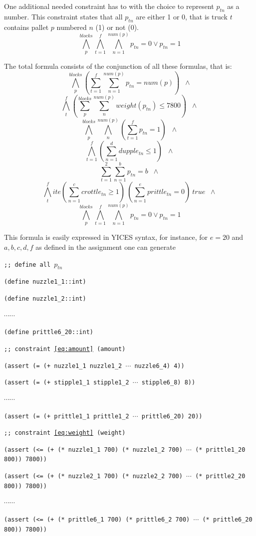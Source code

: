 \documentclass[12pt]{article}
\begin{document}
One additional needed constraint has to with the choice to represent $p_{tn}$
as a number. This constraint states that all $p_{tn}$ are either 1 or 0, that is
truck $t$ contains pallet $p$ numbered $n$ (1) or not (0).
\begin{equation} \label{eq:range}
  \bigwedge_p^{blocks} \bigwedge_{t=1}^f \bigwedge_{n=1}^{num(p)} 
	p_{tn} = 0 \vee p_{tn} = 1
\end{equation}

The total formula consists of the conjunction of all these formulas, that is:
\[ \bigwedge_p^{blocks} (\sum_{t=1}^{f} \sum_{n=1}^{num(p)} p_{tn} = num(p))
	\;\; \wedge \]
\[ \bigwedge_t^f (\sum_p^{blocks} \sum_n^{num(p)} weight(p_{tn}) \leq 7800)
	\;\; \wedge \]
\[ \bigwedge_p^{blocks} \bigwedge_n^{num(p)} (\sum_{t=1}^f p_{tn} = 1) 
	\;\; \wedge \]
\[ \bigwedge_{t=1}^f (\sum_{n=1}^d dupple_{tn} \leq 1) \;\; \wedge \]
\[ \sum_{t=1}^2 \sum_{n=1}^b p_{tn} = b \;\; \wedge \]
\[ \bigwedge_t^f ite 	(\sum_{n=1}^c crottle_{tn} \geq 1)\  
						(\sum_{n=1}^e prittle_{tn} = 0)\ 
						true 
	\;\; \wedge \]
\[ \bigwedge_p^{blocks} \bigwedge_{t=1}^f \bigwedge_{n=1}^{num(p)} 
	p_{tn} = 0 \vee p_{tn} = 1 \]

This formula is easily expressed in YICES syntax, for instance, for
$e=20$ and $a,b,c,d,f$ as defined in the assignment one can generate

{\footnotesize

{\tt ;; define all $p_{tn}$ }

{\tt (define nuzzle1\_1::int) }

{\tt (define nuzzle1\_2::int) }

$\cdots \cdots$

{\tt (define prittle6\_20::int) }

{\tt ;; constraint~\ref{eq:amount} (amount)}

{\tt (assert (= (+ nuzzle1\_1 nuzzle1\_2 $\cdots$ nuzzle6\_4) 4))}

{\tt (assert (= (+ stipple1\_1 stipple1\_2 $\cdots$ stipple6\_8) 8))}

$\cdots \cdots$

{\tt (assert (= (+ prittle1\_1 prittle1\_2 $\cdots$ prittle6\_20) 20))}

{\tt ;; constraint~\ref{eq:weight} (weight)}

{\tt (assert (<= (+ (* nuzzle1\_1 700) (* nuzzle1\_2 700) $\cdots$ 
		(* prittle1\_20 800)) 7800))}

{\tt (assert (<= (+ (* nuzzle2\_1 700) (* nuzzle2\_2 700) $\cdots$ 
		(* prittle2\_20 800)) 7800))}

$\cdots \cdots$

{\tt (assert (<= (+ (* prittle6\_1 700) (* prittle6\_2 700) $\cdots$ 
		(* prittle6\_20 800)) 7800))}
}
\end{document}
